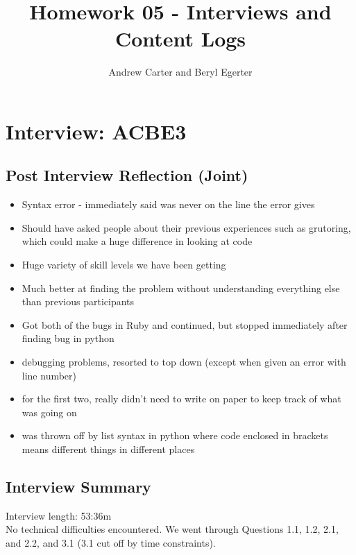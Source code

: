 \documentclass{article}
\title{Homework 05 - Interviews and Content Logs}
\author{Andrew Carter and Beryl Egerter}
\begin{document}
\maketitle
\section{Interview: ACBE3}
\subsection{Post Interview Reflection (Joint)}
\begin{itemize}
  \item Syntax error - immediately said was never on the line the error gives
  \item Should have asked people about their previous experiences such as grutoring, which could make a huge difference in looking at code
  \item Huge variety of skill levels we have been getting
  \item Much better at finding the problem without understanding everything else than previous participants
  \item Got both of the bugs in Ruby and continued, but stopped immediately after finding bug in python
  \item debugging problems, resorted to top down (except when given an error with line number)
  \item for the first two, really didn't need to write on paper to keep track of what was going on
  \item was thrown off by list syntax in python where code enclosed in brackets means different things in different places
\end{itemize}
\subsection{Interview Summary}
Interview length:  53:36m \\
No technical difficulties encountered.
We went through Questions 1.1, 1.2, 2.1, and 2.2, and 3.1 (3.1 cut off by time constraints). 
\end{document}

